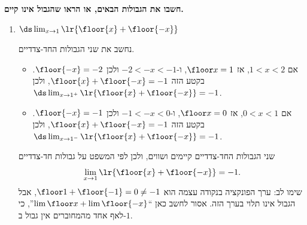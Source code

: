 \textbf{חשבו את הגבולות הבאים, או הראו שהגבול אינו קיים.}
\begin{enumerate}
\item $\ds\lim_{x\to1}\lr{\floor{x}+\floor{-x}}$
\ifsol
{}
\begin{solbox}
נחשב את שני הגבולות החד-צדדיים.
\begin{itemize}
\item אם $1<x<2$, אז $\floor x=1$, ו-$-2<-x<-1$ ולכן $\floor{-x}=-2$. בקטע הזה $\floor{x}+\floor{-x}=-1$, ולכן $\ds\lim_{x\to1^+}\lr{\floor{x}+\floor{-x}}=-1$.
\item אם $0<x<1$, אז $\floor x=0$, ו-$-1<-x<0$ ולכן $\floor{-x}=-1$. בקטע הזה $\floor{x}+\floor{-x}=-1$, ולכן $\ds\lim_{x\to1^-}\lr{\floor{x}+\floor{-x}}=-1$.
\end{itemize}
שני הגבולות החד-צדדיים קיימים ושווים, ולכן לפי המשפט על גבולות חד-צדדיים
\[\lim_{x\to1}\lr{\floor{x}+\floor{-x}}=-1.\]
שימו לב: ערך הפונקציה בנקודה עצמה הוא $\floor1+\floor{-1}=0\ne-1$, אבל הגבול אינו תלוי בערך הזה. אסור לחשב כאן ``$\lim\floor x+\lim\floor{-x}$'', כי לאף אחד מהמחוברים אין גבול ב-$1$.
\end{solbox}
\fi
\end{enumerate}
